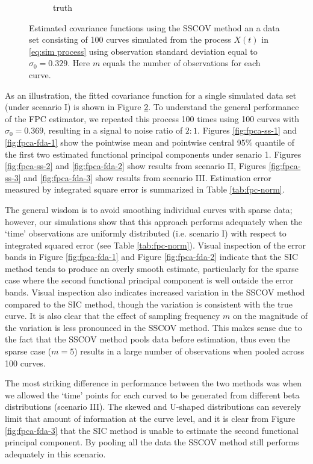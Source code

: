 \begin{figure}
\begin{subfigure}[b]{0.40\textwidth}
                \caption{truth}
                \label{}
        \end{subfigure}
        \caption{Estimated covariance functions using the SSCOV method an a data set consisting of 100 curves simulated from the process $X(t)$ in \eqref{eq:sim process} using observation standard deviation equal to $\sigma_0 = 0.329$. Here $m$ equals the number of observations for each curve. }
        \label{fig:covfits}
\end{figure}
As an illustration, the fitted covariance function for a single simulated data set (under scenario I) is shown in Figure \ref{fig:covfits}. To understand the general performance of the FPC estimator, we repeated this process 100 times using 100 curves with $\sigma_0=0.369$, resulting in a signal to noise ratio of $2:1$. Figures \ref{fig:fpca-ss-1} and \ref{fig:fpca-fda-1} show the pointwise mean and pointwise central 95\% quantile of the first two estimated functional principal components under senario 1.  Figures \ref{fig:fpca-ss-2} and \ref{fig:fpca-fda-2} show results from scenario II, Figures \ref{fig:fpca-ss-3} and \ref{fig:fpca-fda-3} show results from scenario III. Estimation error measured by integrated square error is summarized in Table \ref{tab:fpc-norm}. 

The general wisdom is to avoid smoothing individual curves with sparse data; however, our simulations show that this approach performs adequately when the `time' observations are uniformly distributed (i.e. scenario I) with respect to integrated squared error (see Table \ref{tab:fpc-norm}). Visual inspection of the error bands in Figure \ref{fig:fpca-fda-1} and Figure \ref{fig:fpca-fda-2} indicate that the SIC method tends to produce an overly smooth estimate, particularly for the sparse case where the second functional principal component is well outside the error bands. Visual inspection also indicates increased variation in the SSCOV method compared to the SIC method, though the variation is consistent with the true curve. It is also clear that the effect of sampling frequency $m$ on the magnitude of the variation is less pronounced in the SSCOV method. This makes sense due to the fact that the SSCOV method pools data before estimation, thus even the sparse case ($m = 5$) results in a large number of observations when pooled across 100 curves. 

The most striking difference in performance between the two methods was when we allowed the `time' points for each curved to be generated from different beta distributions (scenario III). The skewed and U-shaped distributions can severely limit that amount of information at the curve level, and it is clear from Figure \ref{fig:fpca-fda-3} that the SIC method is unable to estimate the second functional principal component. By pooling all the data the SSCOV method still performs adequately in this scenario. 


